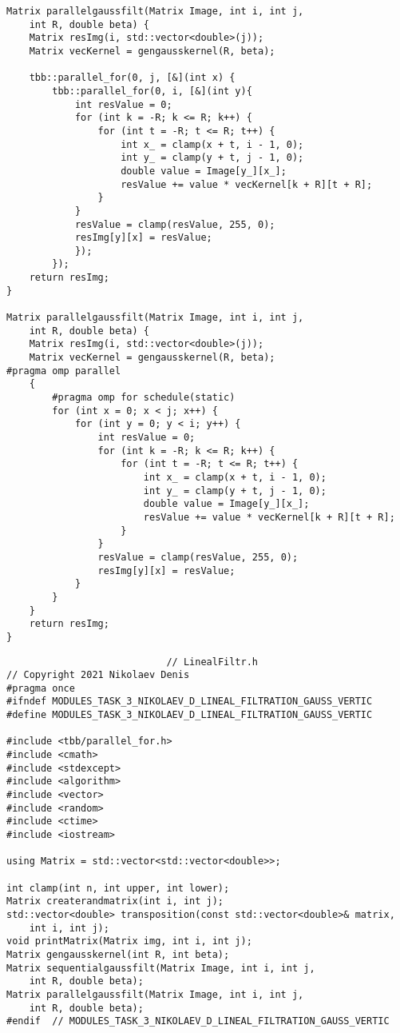 \documentclass{report}
\begin{document}
\begin{lstlisting}
Matrix parallelgaussfilt(Matrix Image, int i, int j,
    int R, double beta) {
    Matrix resImg(i, std::vector<double>(j));
    Matrix vecKernel = gengausskernel(R, beta);

    tbb::parallel_for(0, j, [&](int x) {
        tbb::parallel_for(0, i, [&](int y){
            int resValue = 0;
            for (int k = -R; k <= R; k++) {
                for (int t = -R; t <= R; t++) {
                    int x_ = clamp(x + t, i - 1, 0);
                    int y_ = clamp(y + t, j - 1, 0);
                    double value = Image[y_][x_];
                    resValue += value * vecKernel[k + R][t + R];
                }
            }
            resValue = clamp(resValue, 255, 0);
            resImg[y][x] = resValue;
            });
        });
    return resImg;
}

Matrix parallelgaussfilt(Matrix Image, int i, int j,
    int R, double beta) {
    Matrix resImg(i, std::vector<double>(j));
    Matrix vecKernel = gengausskernel(R, beta);
#pragma omp parallel
    {
        #pragma omp for schedule(static)
        for (int x = 0; x < j; x++) {
            for (int y = 0; y < i; y++) {
                int resValue = 0;
                for (int k = -R; k <= R; k++) {
                    for (int t = -R; t <= R; t++) {
                        int x_ = clamp(x + t, i - 1, 0);
                        int y_ = clamp(y + t, j - 1, 0);
                        double value = Image[y_][x_];
                        resValue += value * vecKernel[k + R][t + R];
                    }
                }
                resValue = clamp(resValue, 255, 0);
                resImg[y][x] = resValue;
            }
        }
    }
    return resImg;
}

\end{lstlisting}
\begin{lstlisting}
							// LinealFiltr.h
// Copyright 2021 Nikolaev Denis
#pragma once
#ifndef MODULES_TASK_3_NIKOLAEV_D_LINEAL_FILTRATION_GAUSS_VERTIC
#define MODULES_TASK_3_NIKOLAEV_D_LINEAL_FILTRATION_GAUSS_VERTIC

#include <tbb/parallel_for.h>
#include <cmath>
#include <stdexcept>
#include <algorithm>
#include <vector>
#include <random>
#include <ctime>
#include <iostream>

using Matrix = std::vector<std::vector<double>>;

int clamp(int n, int upper, int lower);
Matrix createrandmatrix(int i, int j);
std::vector<double> transposition(const std::vector<double>& matrix,
    int i, int j);
void printMatrix(Matrix img, int i, int j);
Matrix gengausskernel(int R, int beta);
Matrix sequentialgaussfilt(Matrix Image, int i, int j,
    int R, double beta);
Matrix parallelgaussfilt(Matrix Image, int i, int j,
    int R, double beta);
#endif  // MODULES_TASK_3_NIKOLAEV_D_LINEAL_FILTRATION_GAUSS_VERTIC

\end{lstlisting}
\end{document}
